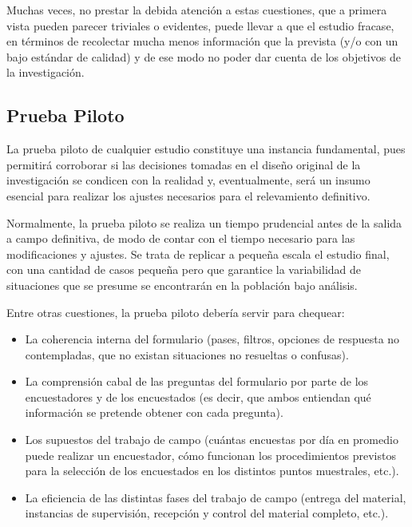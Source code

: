 \documentclass[
]{book}
\begin{document}
Muchas veces, no prestar la debida atención a estas cuestiones, que a primera vista pueden parecer triviales o evidentes, puede llevar a que el estudio fracase, en términos de recolectar mucha menos información que la prevista (y/o con un bajo estándar de calidad) y de ese modo no poder dar cuenta de los objetivos de la investigación.

\hypertarget{prueba-piloto}{%
\subsection{Prueba Piloto}\label{prueba-piloto}}

La prueba piloto de cualquier estudio constituye una instancia fundamental, pues permitirá corroborar si las decisiones tomadas en el diseño original de la investigación se condicen con la realidad y, eventualmente, será un insumo esencial para realizar los ajustes necesarios para el relevamiento definitivo.

Normalmente, la prueba piloto se realiza un tiempo prudencial antes de la salida a campo definitiva, de modo de contar con el tiempo necesario para las modificaciones y ajustes. Se trata de replicar a pequeña escala el estudio final, con una cantidad de casos pequeña pero que garantice la variabilidad de situaciones que se presume se encontrarán en la población bajo análisis.

Entre otras cuestiones, la prueba piloto debería servir para chequear:

\begin{itemize}
\item
  La coherencia interna del formulario (pases, filtros, opciones de respuesta no contempladas, que no existan situaciones no resueltas o confusas).
\item
  La comprensión cabal de las preguntas del formulario por parte de los encuestadores y de los encuestados (es decir, que ambos entiendan qué información se pretende obtener con cada pregunta).
\item
  Los supuestos del trabajo de campo (cuántas encuestas por día en promedio puede realizar un encuestador, cómo funcionan los procedimientos previstos para la selección de los encuestados en los distintos puntos muestrales, etc.).
\item
  La eficiencia de las distintas fases del trabajo de campo (entrega del material, instancias de supervisión, recepción y control del material completo, etc.).
\end{itemize}
\end{document}
